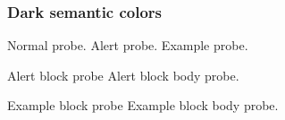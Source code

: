 \documentclass[12pt,aspectratio=169]{beamer}
\begin{document}
\begin{frame}
  \frametitle{Dark semantic colors}
  Normal probe.
  \alert{Alert probe.}
  {Example probe.}
  \begin{alertblock}{Alert block probe}
    Alert block body probe.
  \end{alertblock}
  \begin{exampleblock}{Example block probe}
    Example block body probe.
  \end{exampleblock}
\end{frame}
\end{document}
